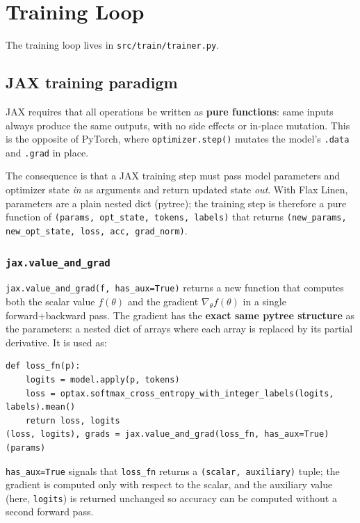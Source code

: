\documentclass[11pt, a4paper]{article}
\begin{document}
\section{Training Loop}

The training loop lives in \texttt{src/train/trainer.py}.

\subsection{JAX training paradigm}

JAX requires that all operations be written as \textbf{pure functions}: same
inputs always produce the same outputs, with no side effects or in-place
mutation. This is the opposite of PyTorch, where \texttt{optimizer.step()}
mutates the model's \texttt{.data} and \texttt{.grad} in place.

The consequence is that a JAX training step must pass model parameters and
optimizer state \emph{in} as arguments and return updated state \emph{out}.
With Flax Linen, parameters are a plain nested dict (pytree); the training
step is therefore a pure function of \texttt{(params, opt\_state, tokens,
labels)} that returns \texttt{(new\_params, new\_opt\_state, loss, acc,
grad\_norm)}.

\subsubsection{\texttt{jax.value\_and\_grad}}

\texttt{jax.value\_and\_grad(f, has\_aux=True)} returns a new function that
computes both the scalar value $f(\theta)$ and the gradient $\nabla_\theta
f(\theta)$ in a single forward+backward pass. The gradient has the \textbf{exact
same pytree structure} as the parameters: a nested dict of arrays where each
array is replaced by its partial derivative. It is used as:
\begin{lstlisting}
def loss_fn(p):
    logits = model.apply(p, tokens)
    loss = optax.softmax_cross_entropy_with_integer_labels(logits, labels).mean()
    return loss, logits
(loss, logits), grads = jax.value_and_grad(loss_fn, has_aux=True)(params)
\end{lstlisting}
\texttt{has\_aux=True} signals that \texttt{loss\_fn} returns a
\texttt{(scalar, auxiliary)} tuple; the gradient is computed only with respect
to the scalar, and the auxiliary value (here, \texttt{logits}) is returned
unchanged so accuracy can be computed without a second forward pass.
\end{document}
